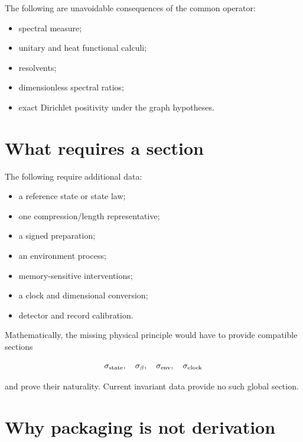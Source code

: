 \documentclass[11pt,a4paper,openany]{report}
\begin{document}
The following are unavoidable consequences of the common operator:

\begin{itemize}
\item 
spectral measure;

\item 
unitary and heat functional calculi;

\item 
resolvents;

\item 
dimensionless spectral ratios;

\item 
exact Dirichlet positivity under the graph hypotheses.

\end{itemize}

\section{What requires a section}

The following require additional data:

\begin{itemize}
\item 
a reference state or state law;

\item 
one compression/\allowbreak{}length representative;

\item 
a signed preparation;

\item 
an environment process;

\item 
memory-sensitive interventions;

\item 
a clock and dimensional conversion;

\item 
detector and record calibration.

\end{itemize}

Mathematically, the missing physical principle would have to provide compatible sections

\[
\sigma_{\rm state},\quad
\sigma_\beta,\quad
\sigma_{\rm env},\quad
\sigma_{\rm clock}
\]

and prove their naturality. Current invariant data provide no such global section.

\section{Why packaging is not derivation}
\end{document}
